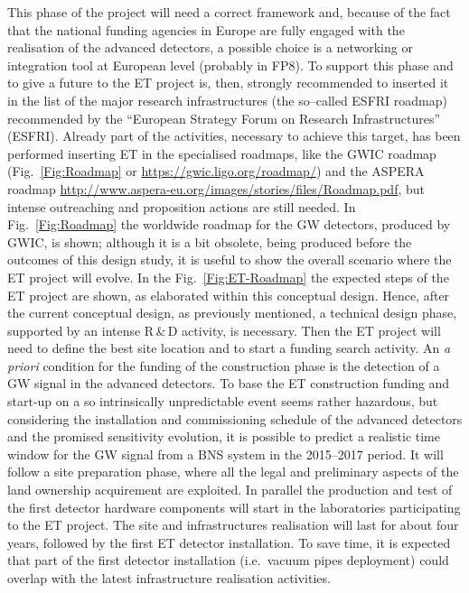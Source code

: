 This phase of the project will need a correct framework and, because of the fact that the national funding agencies in Europe are fully engaged with the realisation of the advanced detectors, a possible choice is a networking or integration tool at European level (probably in FP8). 
To support this phase and to give a future to the ET project is, then, strongly recommended to inserted it in the list of the major research infrastructures (the so--called ESFRI roadmap) recommended by the ``European Strategy Forum on Research Infrastructures'' (ESFRI). Already part of the activities, necessary to achieve this target, has been performed inserting ET in the specialised roadmaps, like the GWIC roadmap (Fig.~\ref{Fig:Roadmap} or \url{https://gwic.ligo.org/roadmap/}) and the ASPERA roadmap \url{http://www.aspera-eu.org/images/stories/files/Roadmap.pdf}, but intense outreaching and proposition actions are still needed. In Fig.~\ref{Fig:Roadmap} the worldwide roadmap for the GW detectors, produced by GWIC, is shown; although it is a bit obsolete, being produced before the outcomes of this design study, it is useful to show the overall scenario where the ET project will evolve. In the Fig.~\ref{Fig:ET-Roadmap} the expected steps of the ET project are shown, as elaborated within this conceptual design. Hence, after the current conceptual design, as previously mentioned, a technical design phase, supported by an intense R\,\&\,D activity, is necessary. Then the ET project will need to define the best site location and to start a funding search activity. An \emph{a priori} condition for the funding of the construction phase is the detection of a GW signal in the advanced detectors. To base the ET construction funding and start-up on a so intrinsically  unpredictable event seems rather hazardous, but considering the  installation and commissioning schedule of the advanced detectors and  the promised sensitivity evolution, it is possible to predict a realistic time window for the GW signal from a BNS system in the 2015--2017 period. 
It will follow a site preparation phase, where all the legal and preliminary aspects of the land ownership acquirement are exploited. In parallel the production and test of the first detector hardware components will start in the laboratories participating to the ET project. The site and infrastructures realisation will last for about four years, followed by the first ET detector installation. To save time, it is expected that part of the first detector installation (i.e.\ vacuum pipes deployment) could overlap with the latest infrastructure realisation activities. 
